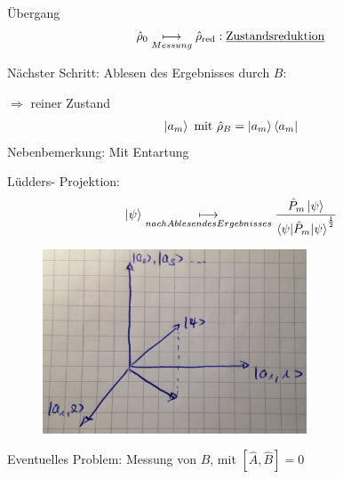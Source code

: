 	Übergang
		\begin{align*}
			\hat{\rho}_0 \underset{Messung}{\longmapsto} \hat{\rho}_{\text{red}}:
			\text{\underline{Zustandsreduktion}}
		\end{align*}
		
	Nächster Schritt: Ablesen des Ergebnisses durch $B$:
	
	$\Rightarrow$ reiner Zustand
		\begin{align*}
			\ket{a_m} \text{ mit } \hat{\rho}_B = \ket{a_m} \bra{a_m}
		\end{align*}
	Nebenbemerkung: Mit Entartung
		
	Lüdders- Projektion:
		\begin{align*}
			\ket{\psi} \underset{nach Ablesen des Ergebnisses}{\longmapsto} 
			\frac{\hat{P}_m \ket{\psi}}{\braket{\psi | \hat{P}_m | \psi}^{\frac{1}{2}}}
		\end{align*}
	\begin{figure}
		\begin{center}
			\includegraphics[width=0.7\textwidth]{Messung2}
		\end{center}
	\end{figure}
	
	Eventuelles Problem: Messung von $B$, mit $[\hat{A}, \hat{B}] = 0$
	
